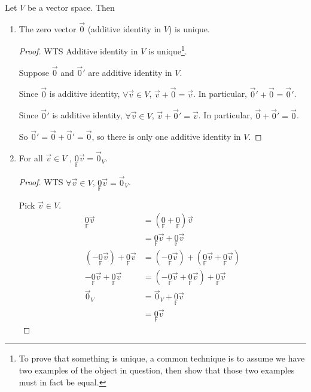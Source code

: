 \documentclass[11pt,fleqn]{book} %
\begin{document}
\setcounter{section}{1}
\setcounter{dummy}{5}
\begin{proposition}
    Let $V$ be a vector space. Then

    \begin{enumerate}[label=\alph*)]
        \item The zero vector $\vec{0}$ (additive identity in $V$) is unique.
        \begin{proof}
            WTS Additive identity in $V$ is unique\footnote{To prove that something is unique, a common technique is to assume we have two examples of the object in question, then show that those two examples must in fact be equal. }.

            Suppose $\vec{0}$ and $\vec{0}'$ are additive identity in $V$.

            Since $\vec{0}$ is additive identity, $\forall \vec{v} \in V$, $\vec{v} + \vec{0} = \vec{v}$. In particular, $\vec{0}' + \vec{0} = \vec{0}'$.

            Since $\vec{0}'$ is additive identity, $\forall \vec{v} \in V$, $\vec{v} + \vec{0}' = \vec{v}$. In particular, $\vec{0} + \vec{0}' = \vec{0}$.

            So $\vec{0}' = \vec{0} + \vec{0}' = \vec{0}$, so there is only one additive identity in $V$.
        \end{proof}

        \item For all $\vec{v} \in V$ , $\underset{\mathbb{F}}{0}\vec{v} = \vec{0}_V$.

        \begin{proof}
            WTS $\forall \vec{v} \in V$, $\underset{\mathbb{F}}{0}\vec{v} = \vec{0}_V$.

            Pick $\vec{v} \in V$.
            \begin{align*}
                \underset{\mathbb{F}}{0}\vec{v}
                &= (\underset{\mathbb{F}}{0} + \underset{\mathbb{F}}{0})\vec{v}
                \\
                &= \underset{\mathbb{F}}{0}\vec{v} + \underset{\mathbb{F}}{0}\vec{v}
                \\
                (-\underset{\mathbb{F}}{0}\vec{v}) + \underset{\mathbb{F}}{0}\vec{v}
                &= (-\underset{\mathbb{F}}{0}\vec{v}) + (\underset{\mathbb{F}}{0}\vec{v} + \underset{\mathbb{F}}{0}\vec{v})
                \\
                -\underset{\mathbb{F}}{0}\vec{v} + \underset{\mathbb{F}}{0}\vec{v}
                &= (-\underset{\mathbb{F}}{0}\vec{v} + \underset{\mathbb{F}}{0}\vec{v}) + \underset{\mathbb{F}}{0}\vec{v}
                \\
                \vec{0}_V
                &=
                \vec{0}_V + \underset{\mathbb{F}}{0}\vec{v}
                \\
                &=\underset{\mathbb{F}}{0}\vec{v}
            \end{align*}


\end{proof}
\end{enumerate}
\end{proposition}
\end{document}
